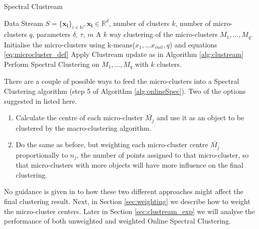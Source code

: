 
\begin{algorithm}
\caption{Spectral Clustream}
\begin{algorithmic}[1]
\REQUIRE  Data Stream $S = \{\boldsymbol{x_i} \}_{i \in \mathbb{N}}, \boldsymbol{x_i} \in \mathbb{R}^d$, number of clusters $k$, number of micro-clusters $q$, parameters $\delta$, $\tau$, $m$
\ENSURE A $k$ way clustering of the micro-clusters $M_1, \ldots, M_q$.
\STATE Initialise the micro-clusters using k-means($x_1, \hdots x_{init},q$) and equations \eqref{eq:microcluster_def}
 \STATE Apply Clustream update as in Algorithm \ref{alg:clustream}
   \STATE Perform Spectral Clustering on $M_1, \ldots, M_q$ with $k$ clusters.
\ENDIF
\ENDFOR

\end{algorithmic}
\label{alg:onlineSpec}
\end{algorithm}

There are a couple of possible ways to feed the micro-clusters into a Spectral Clustering algorithm (step 5 of Algorithm \ref{alg:onlineSpec}). Two of the options suggested in \cite{Zhang1996a} listed here. 

\begin{enumerate}
\item Calculate the centre of each micro-cluster $\bar{M_j}$ and use it as an object to be clustered by the macro-clustering algorithm.
\item Do the same as before, but weighting each micro-cluster centre $\bar{M_j}$ proportionally to $n_j$, the number of points assigned to that micro-cluster, so that micro-clusters with more objects will have more influence on the final clustering.
\end{enumerate}

No guidance is given in \cite{Zhang1996a} to how these two different approaches might affect the final clustering result. Next, in Section \ref{sec:weighting} we describe how to weight the micro-cluster centers. Later in Section \ref{sec:clustream_exp} we will analyse the performance of both unweighted and weighted Online Spectral Clustering.

